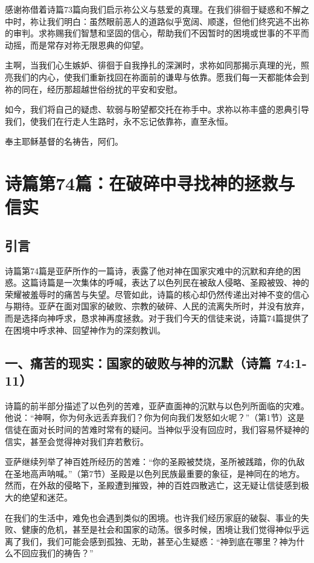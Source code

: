 \documentclass[a4paper, 12pt]{article}
\begin{document}
感谢祢借着诗篇73篇向我们启示祢公义与慈爱的真理。在我们徘徊于疑惑和不解之中时，祢让我们明白：虽然眼前恶人的道路似乎宽阔、顺遂，但他们终究逃不出祢的审判。求祢赐我们智慧和坚固的信心，帮助我们不因暂时的困境或世事的不平而动摇，而是常存对祢无限恩典的仰望。

主啊，当我们心生嫉妒、徘徊于自我挣扎的深渊时，求祢如同那揭示真理的光，照亮我们的内心，使我们重新找回在祢面前的谦卑与依靠。愿我们每一天都能体会到祢的同在，经历那超越世俗纷扰的平安和安慰。

如今，我们将自己的疑虑、软弱与盼望都交托在祢手中。求祢以祢丰盛的恩典引导我们，使我们在行走人生路时，永不忘记依靠祢，直至永恒。

奉主耶稣基督的名祷告，阿们。

\newpage
\section{诗篇第74篇：在破碎中寻找神的拯救与信实}
\subsection*{引言}
\hspace{0.6cm}诗篇第74篇是亚萨所作的一篇诗，表露了他对神在国家灾难中的沉默和弃绝的困惑。这篇诗篇是一次集体的呼喊，表达了以色列民在被敌人侵略、圣殿被毁、神的荣耀被羞辱时的痛苦与失望。尽管如此，诗篇的核心却仍然传递出对神不变的信心与期待。亚萨在面对国家的破败、宗教的破碎、人民的流离失所时，并没有放弃，而是选择向神呼求，恳求神再度拯救。对于我们今天的信徒来说，诗篇74篇提供了在困境中呼求神、回望神作为的深刻教训。
\subsection*{一、痛苦的现实：国家的破败与神的沉默（诗篇 74:1-11）}
\hspace{0.6cm}诗篇的前半部分描述了以色列的苦难，亚萨直面神的沉默与以色列所面临的灾难。他说：“神啊，你为何永远丢弃我们？你为何向我们发怒如火呢？”（第1节）这是信徒在面对长时间的苦难时常有的疑问。当神似乎没有回应时，我们容易怀疑神的信实，甚至会觉得神对我们弃若敷衍。

亚萨继续列举了神百姓所经历的苦难：“你的圣殿被焚烧，圣所被践踏，你的仇敌在圣地高声呐喊。”（第7节）圣殿是以色列民族最重要的象征，是神同在的地方。然而，在外敌的侵略下，圣殿遭到摧毁，神的百姓四散逃亡，这无疑让信徒感到极大的绝望和迷茫。

在我们的生活中，难免也会遇到类似的困境。也许我们经历家庭的破裂、事业的失败、健康的危机，甚至是社会和国家的动荡。很多时候，困境让我们觉得神似乎远离了我们，我们可能会感到孤独、无助，甚至心生疑惑：“神到底在哪里？神为什么不回应我们的祷告？”
\end{document}
